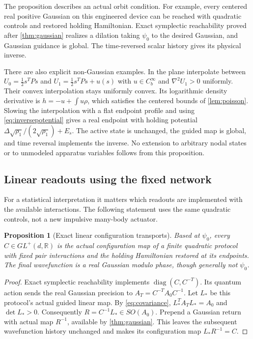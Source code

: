 \documentclass[11pt]{article}
\numberwithin{equation}{section}
\newtheorem{proposition}[proposition]{Proposition}
\theoremstyle{definition}
\newcommand{\R}{\mathbb R}
\newcommand{\Cb}{C_b^\infty}
\newcommand{\diag}{\operatorname{diag}}
\begin{document}
The proposition describes an actual orbit condition. For example,
every centered real positive Gaussian on this engineered device
can be reached with quadratic controls and restored holding
Hamiltonian. Exact symplectic reachability proved after
\cref{thm:gaussian} realizes a dilation taking $\psi_0$ to the
desired Gaussian, and Gaussian guidance is global.
The time-reversed scalar history gives its physical inverse.

There are also explicit non-Gaussian examples. In the plane
interpolate between $U_0=\tfrac12s^TPs$ and
$U_1=\tfrac12s^TPs+u(s)$ with $u\in\Cb$ and
$\nabla^2U_1>0$ uniformly. Their convex interpolation stays uniformly
convex. Its logarithmic density derivative is
$h=-u+\int u\rho$, which satisfies the centered bounds of
\cref{lem:poisson}. Slowing the interpolation with a flat endpoint
profile and using \eqref{eq:inversepotential} gives a real
endpoint with holding potential
$\Delta\sqrt{\rho_1}/(2\sqrt{\rho_1})+E_s$.
The active state is unchanged, the guided map is global, and
time reversal implements the inverse.
No extension to arbitrary nodal states or to unmodeled apparatus
variables follows from this proposition.

\subsection{Linear readouts using the fixed network}

For a statistical interpretation it matters which readouts are
implemented with the available interactions. The following statement
uses the same quadratic controls, not a new impulsive many-body
actuator.

\begin{proposition}[Exact linear configuration transports]\label{prop:readout}
Based at $\psi_0$, every $C\in GL^+(d,\R)$ is the actual
configuration map of a finite quadratic protocol with fixed pair
interactions and the holding Hamiltonian restored at its endpoints.
The final wavefunction is a real Gaussian modulo phase, though
generally not $\psi_0$.
\end{proposition}

\begin{proof}
Exact symplectic reachability implements
$\diag(C,C^{-T})$. Its quantum action sends the real Gaussian
precision to $A_T=C^{-T}A_0C^{-1}$.
Let $L_*$ be this protocol's actual guided linear map.
By \eqref{eq:covariance},
$L_*^TA_TL_*=A_0$ and $\det L_*>0$.
Consequently $R=C^{-1}L_*\in SO(A_0)$.
Prepend a Gaussian return with actual map $R^{-1}$, available
by \cref{thm:gaussian}. This leaves the subsequent wavefunction history unchanged and makes
its configuration map
$L_*R^{-1}=C$.
\end{proof}
\end{document}
